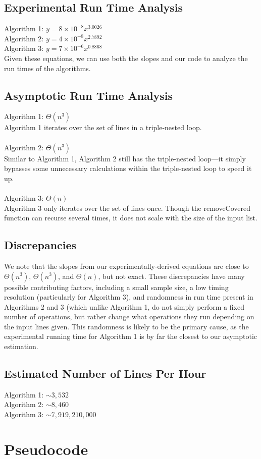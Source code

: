 \documentclass{article}
\begin{document}
\pagebreak

\subsection*{Experimental Run Time Analysis}
Algorithm 1: $y=8 \times 10^{-8}x^{3.0026}$\\
Algorithm 2: $y=4 \times 10^{-8}x^{2.7892}$\\
Algorithm 3: $y=7 \times 10^{-6}x^{0.8868}$\\

Given these equations, we can use both the slopes and our code to analyze the run times of the algorithms.

\subsection*{Asymptotic Run Time Analysis}
Algorithm 1: $\Theta(n^3)$\\
\indent Algorithm 1 iterates over the set of lines in a triple-nested loop.\\\\
Algorithm 2: $\Theta(n^3)$\\
\indent Similar to Algorithm 1, Algorithm 2 still has the triple-nested loop---it simply bypasses some unnecessary calculations within the triple-nested loop to speed it up.\\\\
Algorithm 3: $\Theta(n)$\\
\indent Algorithm 3 only iterates over the set of lines once.  Though the removeCovered function can recurse several times, it does not scale with the size of the input list.

\subsection*{Discrepancies}
We note that the slopes from our experimentally-derived equations are close to $\Theta(n^3)$, $\Theta(n^3)$, and $\Theta(n)$, but not exact.  These discrepancies have many possible contributing factors, including a small sample size, a low timing resolution (particularly for Algorithm 3), and randomness in run time present in Algorithms 2 and 3 (which unlike Algorithm 1, do not simply perform a fixed number of operations, but rather change what operations they run depending on the input lines given.  This randomness is likely to be the primary cause, as the experimental running time for Algorithm 1 is by far the closest to our asymptotic estimation.

\subsection*{Estimated Number of Lines Per Hour}
Algorithm 1: $\sim 3,532$\\
Algorithm 2: $\sim 8,460$\\
Algorithm 3: $\sim 7,919,210,000$

\pagebreak

\section*{Pseudocode}

\end{document}
